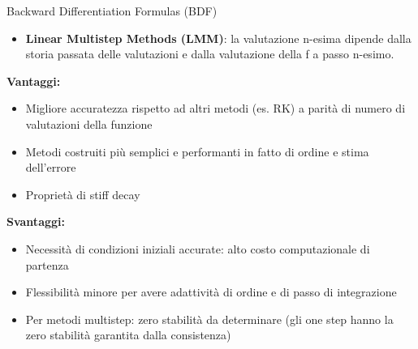 \documentclass[aspectratio=169, 10pt, handout,usenames,dvipsnames]{beamer}
\begin{document}
    \begin{frame}{Backward Differentiation Formulas (BDF)}
        \begin{itemize}
            \item \textbf{Linear Multistep Methods (LMM)}: la valutazione n-esima dipende dalla storia passata delle valutazioni e dalla valutazione della f a passo n-esimo.
            \end{itemize}
            \textbf{Vantaggi:}
        \begin{itemize}
            \item Migliore accuratezza rispetto ad altri metodi (es. RK) a parità di numero di valutazioni della funzione
            \item Metodi costruiti più semplici e performanti in fatto di ordine e stima dell’errore 
            \item Proprietà di stiff decay
        \end{itemize}
        \textbf{Svantaggi:}
        \begin{itemize}
            \item Necessità di condizioni iniziali accurate: alto costo computazionale di partenza 
            \item Flessibilità minore per avere adattività di ordine e di passo di integrazione
            \item Per metodi multistep: zero stabilità da determinare (gli one step hanno la zero stabilità garantita dalla consistenza)
        \end{itemize}
            
            
            
            
    \end{frame}
\end{document}

